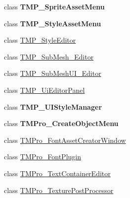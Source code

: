 \begin{DoxyCompactItemize}
\item 
class {\bfseries T\+M\+P\+\_\+\+Sprite\+Asset\+Menu}
\item 
class {\bfseries T\+M\+P\+\_\+\+Style\+Asset\+Menu}
\item 
class \mbox{\hyperlink{class_t_m_pro_1_1_editor_utilities_1_1_t_m_p___style_editor}{T\+M\+P\+\_\+\+Style\+Editor}}
\item 
class \mbox{\hyperlink{class_t_m_pro_1_1_editor_utilities_1_1_t_m_p___sub_mesh___editor}{T\+M\+P\+\_\+\+Sub\+Mesh\+\_\+\+Editor}}
\item 
class \mbox{\hyperlink{class_t_m_pro_1_1_editor_utilities_1_1_t_m_p___sub_mesh_u_i___editor}{T\+M\+P\+\_\+\+Sub\+Mesh\+U\+I\+\_\+\+Editor}}
\item 
class \mbox{\hyperlink{class_t_m_pro_1_1_editor_utilities_1_1_t_m_p___ui_editor_panel}{T\+M\+P\+\_\+\+Ui\+Editor\+Panel}}
\item 
class {\bfseries T\+M\+P\+\_\+\+U\+I\+Style\+Manager}
\item 
class {\bfseries T\+M\+Pro\+\_\+\+Create\+Object\+Menu}
\item 
class \mbox{\hyperlink{class_t_m_pro_1_1_editor_utilities_1_1_t_m_pro___font_asset_creator_window}{T\+M\+Pro\+\_\+\+Font\+Asset\+Creator\+Window}}
\item 
class \mbox{\hyperlink{class_t_m_pro_1_1_editor_utilities_1_1_t_m_pro___font_plugin}{T\+M\+Pro\+\_\+\+Font\+Plugin}}
\item 
class \mbox{\hyperlink{class_t_m_pro_1_1_editor_utilities_1_1_t_m_pro___text_container_editor}{T\+M\+Pro\+\_\+\+Text\+Container\+Editor}}
\item 
class \mbox{\hyperlink{class_t_m_pro_1_1_editor_utilities_1_1_t_m_pro___texture_post_processor}{T\+M\+Pro\+\_\+\+Texture\+Post\+Processor}}
\end{DoxyCompactItemize}
